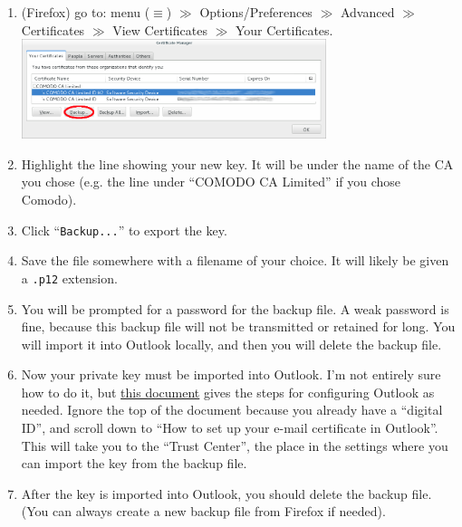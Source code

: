 \documentclass[pdftex,12pt,titlepage=false]{scrartcl}
\begin{document}
\begin{enumerate}
  \item (Firefox) go to: menu ($\equiv$) $\gg$ Options/Preferences $\gg$ Advanced
  $\gg$ Certificates $\gg$ View Certificates $\gg$ Your Certificates.\\[1em]%
  \includegraphics[width=0.7\textwidth]{images/firefox_cert_settings.png}
\item Highlight the line showing your new key.  It will be under the
  name of the CA you chose (e.g. the line under ``COMODO CA Limited''
  if you chose Comodo).
\item %
  Click ``\texttt{Backup...}'' to export the key.
\item Save the file somewhere with a filename of your choice.  It will
  likely be given a \verb|.p12| extension.
\item\label{makebupw} You will be prompted for a password for the
  backup file.  A weak password is fine, because this backup file will
  not be transmitted or retained for long.  You will import it into
  Outlook locally, and then you will delete the backup file.
\item Now your private key must be imported into Outlook.  I'm not
  entirely sure how to do it, but
  \href{https://www.ablebits.com/office-addins-blog/2014/04/11/email-encryption-outlook/}{this
    document} gives the steps for configuring Outlook as
  needed. Ignore the top of the document because you already have a
  ``digital ID'', and scroll down to ``How to set up your e-mail
  certificate in Outlook''.  This will take you to the ``Trust
  Center'', the place in the settings where you can import the key
  from the backup file.
\item After the key is imported into Outlook, you should delete the
  backup file.  (You can always create a new backup file from Firefox
  if needed).
\end{enumerate}
\end{document}
